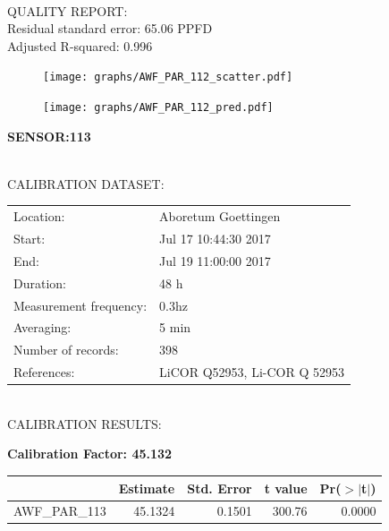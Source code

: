 \documentclass[oneside]{report}
\begin{document}
\hrulefill\\
QUALITY REPORT:\\
Residual standard error: 65.06 PPFD\\
Adjusted R-squared: 0.996



\begin{figure}[H]
  \centering
  \texttt{[image: graphs/AWF\_PAR\_112\_scatter.pdf]}
\end{figure}




\begin{figure}[H]
  \centering
  \texttt{[image: graphs/AWF\_PAR\_112\_pred.pdf]}
\end{figure}

\pagebreak


\begin{center}
\large{\textbf{SENSOR:113}}\\
\end{center}

\hrulefill\\
CALIBRATION DATASET:\\
\begin{table}[h!]
  \centering
  \label{tab:table1}
  \begin{tabular}{ll}
    Location: & Aboretum Goettingen\\ 
    
    
    Start:  & Jul 17 10:44:30 2017 \\
    End:   & Jul 19 11:00:00 2017\\ 
    Duration: & 48 h\\
    Measurement frequency: & 0.3hz\\
    Averaging:  &5 min\\
    Number of records: & 398 \\
    References: & LiCOR Q52953, Li-COR Q 52953 \\
  \end{tabular}
\end{table}

\hrulefill\\
CALIBRATION RESULTS:\\


\begin{center}
\textbf{\large{Calibration Factor: 45.132}}\\
\end{center}
\begin{table}[ht]
\centering
\begin{tabular}{rrrrr}
  \hline
 & Estimate & Std. Error & t value & Pr($>$$|$t$|$) \\ 
  \hline
AWF\_PAR\_113 & 45.1324 & 0.1501 & 300.76 & 0.0000 \\ 
   \hline
\end{tabular}
\end{table}
\end{document}
